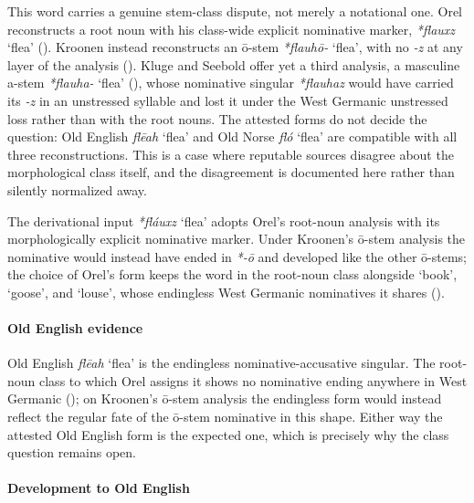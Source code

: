 \documentclass[
  british,
  a4paper,
]{article}
\providecommand{\Recon}[1]{\emph{*#1}}
\begin{document}
This word carries a genuine stem-class dispute, not merely a notational
one. Orel reconstructs a root noun with his class-wide explicit
nominative marker, \emph{*flauxz} `flea' (). Kroonen instead reconstructs an ō-stem {\emph{*flauhō-}}
`flea', with no \emph{-z} at any layer of the analysis
(). Kluge and Seebold offer
yet a third analysis, a masculine a-stem {\emph{*flauha-}} `flea'
(), whose nominative
singular \emph{*flauhaz} would have carried its \emph{-z} in an
unstressed syllable and lost it under the West Germanic unstressed loss
rather than with the root nouns. The attested forms do not decide the
question: Old English \emph{flēah} `flea' and Old Norse \emph{fló}
`flea' are compatible with all three reconstructions. This is a case
where reputable sources disagree about the morphological class itself,
and the disagreement is documented here rather than silently normalized
away.

The derivational input \Recon{fláuxz} `flea' adopts Orel's root-noun
analysis with its morphologically explicit nominative marker. Under
Kroonen's ō-stem analysis the nominative would instead have ended in
\emph{*-ō} and developed like the other ō-stems; the choice of Orel's
form keeps the word in the root-noun class alongside `book', `goose',
and `louse', whose endingless West Germanic nominatives it shares
().

\paragraph{Old English evidence}\label{old-english-evidence-23}

Old English {\emph{flēah}} `flea' is the endingless
nominative-accusative singular. The root-noun class to which Orel
assigns it shows no nominative ending anywhere in West Germanic
(); on
Kroonen's ō-stem analysis the endingless form would instead reflect the
regular fate of the ō-stem nominative in this shape. Either way the
attested Old English form is the expected one, which is precisely why
the class question remains open.

\paragraph{Development to Old
English}\label{development-to-old-english-23}
\end{document}
